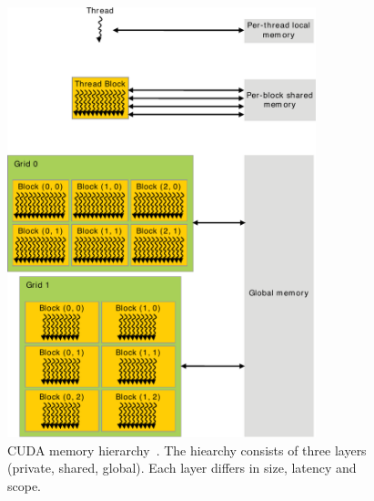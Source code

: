 \begin{figure}[!htbp]
  \centering
  \includegraphics[width=0.8\textwidth]{img/memory_hierarchy.pdf}
  \caption[CUDA memory hierarchy.]{CUDA memory hierarchy~\cite{CudaProgrammingGuide}. The hiearchy consists of three layers (private, shared, global). Each layer differs in size, latency and scope.}
  \label{fig:memory_hierarchy}
\end{figure}
